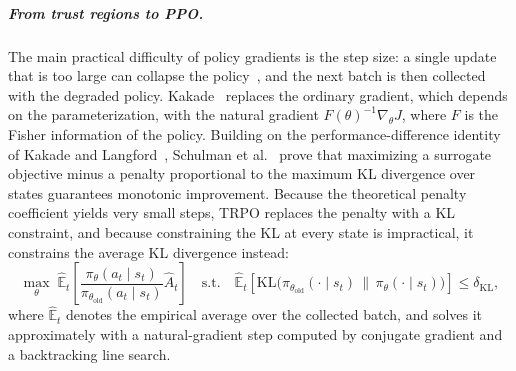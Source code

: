 \subparagraph{From trust regions to PPO.}
The main practical difficulty of policy gradients is the step size: a single update that is too large can collapse
the policy~\cite{schulman2015trpo,schulman2017ppo}, and the next batch is then collected with the degraded policy.
Kakade~\cite{kakade2002npg} replaces the ordinary gradient, which depends on the parameterization, with the natural
gradient $F(\theta)^{-1}\nabla_\theta J$, where $F$ is the Fisher information of the policy. Building on the
performance-difference identity of Kakade and Langford~\cite{kakade2002approximately}, Schulman et
al.~\cite{schulman2015trpo} prove that maximizing a surrogate objective minus a penalty proportional to the maximum KL
divergence over states guarantees monotonic improvement. Because the theoretical penalty coefficient yields very
small steps, TRPO replaces the penalty with a KL constraint, and because constraining the KL at every state is
impractical, it constrains the average KL divergence instead:
\begin{equation}
  \max_\theta\; \hat{\mathbb{E}}_t\!\left[\frac{\pi_\theta(a_t \mid s_t)}{\pi_{\theta_{\mathrm{old}}}(a_t \mid s_t)}\hat{A}_t\right]
  \quad \text{s.t.} \quad
  \hat{\mathbb{E}}_t\!\left[\mathrm{KL}\bigl(\pi_{\theta_{\mathrm{old}}}(\cdot \mid s_t)\,\|\,\pi_\theta(\cdot \mid s_t)\bigr)\right] \le \delta_{\mathrm{KL}},
  \label{eq:trpo}
\end{equation}
where $\hat{\mathbb{E}}_t$ denotes the empirical average over the collected batch, and solves it approximately with a
natural-gradient step computed by conjugate gradient and a backtracking line search.

